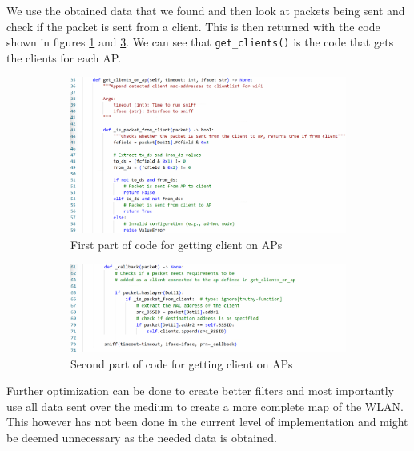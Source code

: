We use the obtained data that we found and then look at packets being sent and check if the packet is sent from a client. This is then returned with the code shown in figures \ref{get_client1} and \ref{get_client2}. We can see that \lstinline{get_clients()} is the code that gets the clients for each AP.

\begin{figure}[H]
     \centering
     \begin{subfigure}{0.49\textwidth}
         \centering
         \includegraphics[width=\textwidth]{Latex-Files/Billeder/Implementation/get_client1.png}
         \caption{First part of code for getting client on APs}
         \label{get_client1}
     \end{subfigure}
     \hfill
     \begin{subfigure}{0.49\textwidth}
         \centering
         \includegraphics[width=\textwidth]{Latex-Files/Billeder/Implementation/get_client2.png}
         \caption{Second part of code for getting client on APs}
         \label{get_client2}
     \end{subfigure}
     \hfill
     \caption{}
\end{figure}



Further optimization can be done to create better filters and most importantly use all data sent over the medium to create a more complete map of the WLAN. This however has not been done in the current level of implementation and might be deemed unnecessary as the needed data is obtained.

